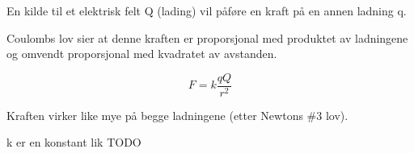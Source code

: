 En kilde til et elektrisk felt Q (lading) vil påføre en kraft
på en annen ladning q.

Coulombs lov sier at denne kraften er
proporsjonal med produktet av ladningene og
omvendt proporsjonal med kvadratet av avstanden.

$$F = k \frac{q Q}{r^2}$$

Kraften virker like mye på begge ladningene (etter Newtons \#3 lov).

k er en konstant lik TODO
